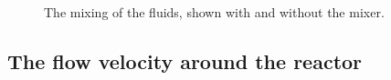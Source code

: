 \documentclass{article}
\begin{document}
\begin{figure}[ht]
\centering
{}
\caption{The mixing of the fluids, shown with and without the mixer.}
\label{fluids}
\end{figure}  

\subsection*{The flow velocity around the reactor}
\end{document}
